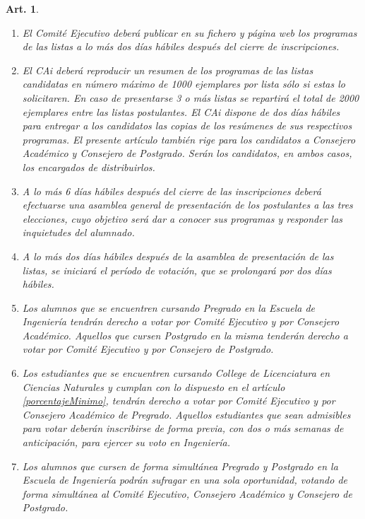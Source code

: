 \documentclass[letterpaper,11pt]{article}
\theoremstyle{plain}
\newtheorem{art}{Art.} %
\begin{document}
\begin{art}
\begin{enumerate}
				\item El Comité Ejecutivo deberá publicar en su fichero y página web los programas de las listas a lo más dos días hábiles después del cierre de inscripciones.
				
				\item El CAi deberá reproducir un resumen de los programas de las listas candidatas en número máximo de 1000 ejemplares por lista sólo si estas lo solicitaren. En caso de presentarse 3 o más listas se repartirá el total de 2000 ejemplares entre las listas postulantes. El CAi dispone de dos días hábiles para entregar a los candidatos las copias de los resúmenes de sus respectivos programas. El presente artículo también rige para los candidatos a Consejero Académico y Consejero de Postgrado. Serán los candidatos, en ambos casos, los encargados de distribuirlos.
				
				\item A lo más 6 días hábiles después del cierre de las inscripciones deberá efectuarse una asamblea general de presentación de los postulantes a las tres elecciones, cuyo objetivo será dar a conocer sus programas y responder las inquietudes del alumnado.
				
				\item \label{periodo}A lo más dos días hábiles después de la asamblea de presentación de las listas, se iniciará el período de votación, que se prolongará por dos días hábiles.
				
				\item \label{votantes}Los alumnos que se encuentren cursando Pregrado en la Escuela de Ingeniería tendrán derecho a votar por Comité Ejecutivo y por Consejero Académico. Aquellos que cursen Postgrado en la misma tenderán derecho a votar por Comité Ejecutivo y por Consejero de Postgrado.

				\item \label{votantesCollege} Los estudiantes que se encuentren cursando College de Licenciatura en Ciencias Naturales y cumplan con lo dispuesto en el artículo \ref{porcentajeMinimo}, tendrán derecho a votar por Comité Ejecutivo y por Consejero Académico de Pregrado. Aquellos estudiantes que sean admisibles para votar deberán inscribirse de forma previa, con dos o más semanas de anticipación, para ejercer su voto en Ingeniería.
				
				\item Los alumnos que cursen de forma simultánea Pregrado y Postgrado en la Escuela de Ingeniería podrán sufragar en una sola oportunidad, votando de forma simultánea al Comité Ejecutivo, Consejero Académico y Consejero de Postgrado.
				

\end{enumerate}
\end{art}
\end{document}
